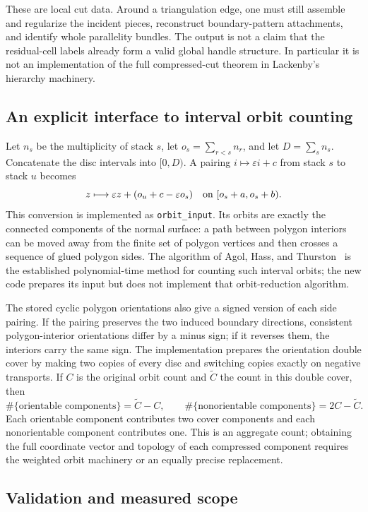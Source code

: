 These are local cut data. Around a triangulation edge, one must still
assemble and regularize the incident pieces, reconstruct boundary-pattern
attachments, and identify whole parallelity bundles. The output is not a
claim that the residual-cell labels already form a valid global handle
structure. In particular it is not an implementation of the full
compressed-cut theorem in Lackenby's hierarchy machinery.

\subsection{An explicit interface to interval orbit counting}

Let $n_s$ be the multiplicity of stack $s$, let
$o_s=\sum_{r<s}n_r$, and let $D=\sum_s n_s$.
Concatenate the disc intervals into $[0,D)$. A pairing
$i\mapsto\varepsilon i+c$ from stack $s$ to stack $u$ becomes
\[
 z\longmapsto\varepsilon z+(o_u+c-\varepsilon o_s)
 \quad\hbox{on }[o_s+a,o_s+b).
\]
This conversion is implemented as \texttt{orbit\_input}. Its orbits are
exactly the connected components of the normal surface: a path between
polygon interiors can be moved away from the finite set of polygon
vertices and then crosses a sequence of glued polygon sides. The algorithm
of Agol, Hass, and Thurston~\cite{aht} is the established polynomial-time method for
counting such interval orbits; the new code prepares its input but does
not implement that orbit-reduction algorithm.

The stored cyclic polygon orientations also give a signed version of
each side pairing. If the pairing preserves the two induced boundary
directions, consistent polygon-interior orientations differ by a minus
sign; if it reverses them, the interiors carry the same sign.
The implementation prepares the orientation double cover by making two
copies of every disc and switching copies exactly on negative transports.
If $C$ is the original orbit count and $\widetilde C$ the count in this
double cover, then
\[
 \#\{\text{orientable components}\}=\widetilde C-C,
 \qquad
 \#\{\text{nonorientable components}\}=2C-\widetilde C.
\]
Each orientable component contributes two cover components and each
nonorientable component contributes one. This is an aggregate count;
obtaining the full coordinate vector and topology of each compressed
component requires the weighted orbit machinery or an equally precise
replacement.

\subsection{Validation and measured scope}

